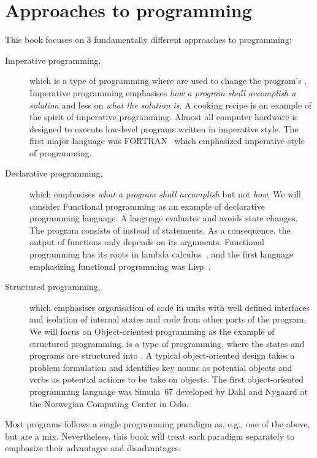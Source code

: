 \section{Approaches to programming}
This book focuses on 3 fundamentally different approaches to programming: 
\begin{description}
\item[Imperative programming,] which is a type of programming where  are used to change the program's . Imperative programming emphasises \emph{how a program shall accomplish a solution} and less on \emph{what the solution is}. A cooking recipe is an example of the spirit of imperative programming. Almost all computer hardware is designed to execute low-level programs written in imperative style. The first major language was FORTRAN~\cite{backus54} which emphasized imperative style of programming.
\item[Declarative programming,] which emphasises \emph{what a program shall accomplish} but not \emph{how}. We will consider Functional programming  as an example of declarative programming language. A  language evaluates  and avoids state changes. The program consists of  instead of statements. As a consequence, the output of functions only depends on its arguments. Functional programming has its roots in lambda calculus~\cite{church32}, and the first language emphasizing functional programming was Lisp~\cite{mccarthy60}. 
\item[Structured programming,] which emphasises organisation of code in units with well defined interfaces and isolation of internal states and code from other parts of the program. We will focus on Object-oriented programming as the example of structured programming.  is a type of programming, where the states and programs are structured into . A typical object-oriented design takes a problem formulation and identifies key nouns as potential objects and verbs as potential actions to be take on objects. The first object-oriented programming language was Simula~67 developed by Dahl and Nygaard at the Norwegian Computing Center in Oslo.
\end{description}
Most programs follows a single programming paradigm as, e.g., one of the above, but are a mix. Nevertheless, this book will treat each paradigm separately to emphasize their advantages and disadvantages.

